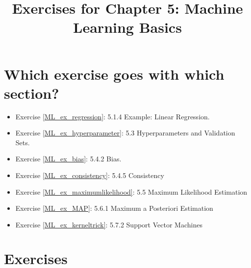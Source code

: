 \documentclass{article}
\title{Exercises for Chapter 5: Machine Learning Basics}
\begin{document}
\maketitle

\section*{Which exercise goes with which section?}
\begin{itemize}
    \item Exercise \ref{ML_ex_regression}: 5.1.4 Example: Linear Regression.
    \item Exercise \ref{ML_ex_hyperparameter}: 5.3 Hyperparameters and Validation Sets.
    \item Exercise \ref{ML_ex_bias}: 5.4.2 Bias.
    \item Exercise \ref{ML_ex_consistency}: 5.4.5 Consistency
    \item Exercise \ref{ML_ex_maximumlikelihood}: 5.5 Maximum Likelihood Estimation
    \item Exercise \ref{ML_ex_MAP}: 5.6.1 Maximum a Posteriori Estimation
    \item Exercise \ref{ML_ex_kerneltrick}: 5.7.2 Support Vector Machines
\end{itemize}

\section*{Exercises}
\end{document}
